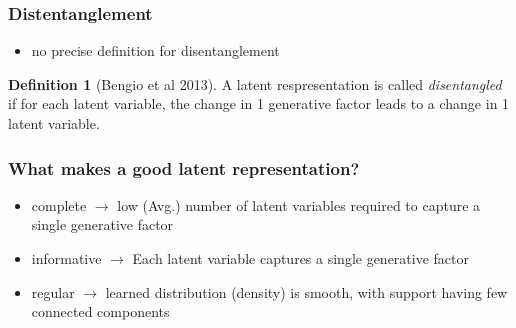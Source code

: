 \documentclass{beamer}
\theoremstyle{definition}
\newtheorem{definition}[section]{Definition}
\begin{document}
      \begin{frame}
        \frametitle{Distentanglement}
        \begin{itemize}
          \item no precise definition for disentanglement
        \end{itemize}
        \begin{definition}[Bengio et al 2013]
          A latent respresentation is called \textit{disentangled} if for each latent variable, the change in 1 generative factor leads to a change in 1 latent variable.
        \end{definition}
      \end{frame}

    \begin{frame}
      \frametitle{What makes a good latent representation?}
      \begin{itemize}
        \item complete $\rightarrow$ low (Avg.) number of latent variables required to capture a single generative factor
        \item informative $\rightarrow$ Each latent variable captures a single generative factor
        \item regular $\rightarrow$ learned distribution (density) is smooth, with support having few connected components
      \end{itemize}
    \end{frame}
\end{document}
